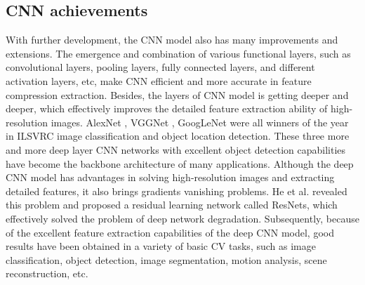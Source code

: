 \documentclass[10pt, a4paper]{article}
\begin{document}
\begin{multicols}{2}
	\section{CNN achievements} \justify
	With further development, the CNN model also has many improvements and extensions. The emergence and combination of various functional layers, such as convolutional layers, pooling layers, fully connected layers, and different activation layers, etc, make CNN efficient and more accurate in feature compression extraction. Besides, the layers of CNN model is getting deeper and deeper, which effectively improves the detailed feature extraction ability of high-resolution images. AlexNet \cite{krizhevsky2017imagenet}, VGGNet \cite{simonyan2014very}, GoogLeNet \cite{szegedy2015going} were all winners of the year in ILSVRC image classification and object location detection. These three more and more deep layer CNN networks with excellent object detection capabilities have become the backbone architecture of many applications. Although the deep CNN model has advantages in solving high-resolution images and extracting detailed features, it also brings gradients vanishing problems. He et al. \cite{he2016deep} revealed this problem and proposed a residual learning network called ResNets, which effectively solved the problem of deep network degradation. Subsequently, because of the excellent feature extraction capabilities of the deep CNN model, good results have been obtained in a variety of basic CV tasks, such as image classification, object detection, image segmentation, motion analysis, scene reconstruction, etc. 
	\par

\end{multicols}
\end{document}
